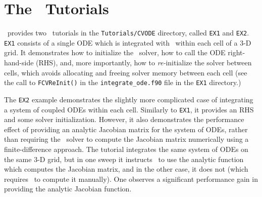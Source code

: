 \section{The \cvode\ Tutorials}

\amrex\ provides two \cvode\ tutorials in the \texttt{Tutorials/CVODE} directory, called \texttt{EX1} and \texttt{EX2}.
\texttt{EX1} consists of a single ODE which is integrated with \cvode\ within each cell of a 3-D grid.
It demonstrates how to initialize the \cvode\ solver, how to call the ODE right-hand-side (RHS), and, more importantly, how to \emph{re-}initialize the solver between cells, which avoids allocating and freeing solver memory between each cell (see the call to \texttt{FCVReInit()} in the \texttt{integrate\_ode.f90} file in the \texttt{EX1} directory.)

The \texttt{EX2} example demonstrates the slightly more complicated case of integrating a system of coupled ODEs within each cell.
Similarly to \texttt{EX1}, it provides an RHS and some solver initialization.
However, it also demonstrates the performance effect of providing an analytic Jacobian matrix for the system of ODEs, rather than requiring the \cvode\ solver to compute the Jacobian matrix numerically using a finite-difference approach.
The tutorial integrates the same system of ODEs on the same 3-D grid, but in one sweep it instructs \cvode\ to use the analytic function which computes the Jacobian matrix, and in the other case, it does not (which requires \cvode\ to compute it manually).
One observes a significant performance gain in providing the analytic Jacobian function.
